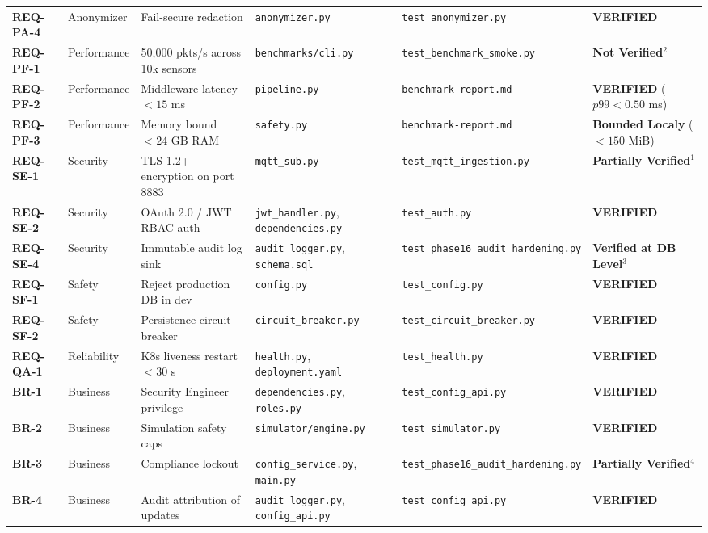 \begin{table}[H]
\begin{tabularx}{\linewidth}{@{}l p{1.6cm} p{2.4cm} p{2.2cm} p{2.2cm} p{2.5cm}@{}}
\textbf{REQ-PA-4} & Anonymizer & Fail-secure redaction & \texttt{anonymizer.py} & \texttt{test\_anonymizer.py} & \textbf{VERIFIED} \\
\textbf{REQ-PF-1} & Performance & 50,000 pkts/s across 10k sensors & \texttt{benchmarks/cli.py} & \texttt{test\_benchmark\_smoke.py} & \textbf{Not Verified}$^2$ \\
\textbf{REQ-PF-2} & Performance & Middleware latency $< 15$ ms & \texttt{pipeline.py} & \texttt{benchmark-report.md} & \textbf{VERIFIED} ($p99 < 0.50$ ms) \\
\textbf{REQ-PF-3} & Performance & Memory bound $< 24$ GB RAM & \texttt{safety.py} & \texttt{benchmark-report.md} & \textbf{Bounded Localy} ($< 150$ MiB) \\
\textbf{REQ-SE-1} & Security & TLS 1.2+ encryption on port 8883 & \texttt{mqtt\_sub.py} & \texttt{test\_mqtt\_ingestion.py} & \textbf{Partially Verified}$^1$ \\
\textbf{REQ-SE-2} & Security & OAuth 2.0 / JWT RBAC auth & \texttt{jwt\_handler.py}, \texttt{dependencies.py} & \texttt{test\_auth.py} & \textbf{VERIFIED} \\
\textbf{REQ-SE-4} & Security & Immutable audit log sink & \texttt{audit\_logger.py}, \texttt{schema.sql} & \texttt{test\_phase16\_audit\_hardening.py} & \textbf{Verified at DB Level}$^3$ \\
\textbf{REQ-SF-1} & Safety & Reject production DB in dev & \texttt{config.py} & \texttt{test\_config.py} & \textbf{VERIFIED} \\
\textbf{REQ-SF-2} & Safety & Persistence circuit breaker & \texttt{circuit\_breaker.py} & \texttt{test\_circuit\_breaker.py} & \textbf{VERIFIED} \\
\textbf{REQ-QA-1} & Reliability & K8s liveness restart $< 30$ s & \texttt{health.py}, \texttt{deployment.yaml} & \texttt{test\_health.py} & \textbf{VERIFIED} \\
\textbf{BR-1} & Business & Security Engineer privilege & \texttt{dependencies.py}, \texttt{roles.py} & \texttt{test\_config\_api.py} & \textbf{VERIFIED} \\
\textbf{BR-2} & Business & Simulation safety caps & \texttt{simulator/engine.py} & \texttt{test\_simulator.py} & \textbf{VERIFIED} \\
\textbf{BR-3} & Business & Compliance lockout & \texttt{config\_service.py}, \texttt{main.py} & \texttt{test\_phase16\_audit\_hardening.py} & \textbf{Partially Verified}$^4$ \\
\textbf{BR-4} & Business & Audit attribution of updates & \texttt{audit\_logger.py}, \texttt{config\_api.py} & \texttt{test\_config\_api.py} & \textbf{VERIFIED} \\

\end{tabularx}
\end{table}
